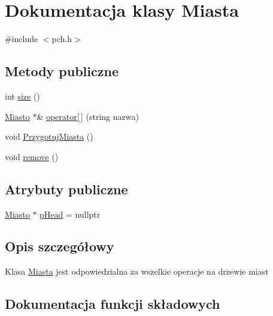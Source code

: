 \hypertarget{class_miasta}{}\section{Dokumentacja klasy Miasta}
\label{class_miasta}


{\ttfamily \#include $<$pch.\+h$>$}

\subsection*{Metody publiczne}
\begin{DoxyCompactItemize}
\item 
int \mbox{\hyperlink{class_miasta_a1f77750958b72a576e37039157741b88}{size}} ()
\item 
\mbox{\hyperlink{struct_miasto}{Miasto}} $\ast$\& \mbox{\hyperlink{class_miasta_ae709896387a043d6d0757e8ee2ebe1eb}{operator\mbox{[}$\,$\mbox{]}}} (string nazwa)
\item 
void \mbox{\hyperlink{class_miasta_a0ed245b8f82ddfde5299e173159cc4d5}{Przygotuj\+Miasta}} ()
\item 
void \mbox{\hyperlink{class_miasta_a62181d2fa245835be892f2beb966e1e6}{remove}} ()
\end{DoxyCompactItemize}
\subsection*{Atrybuty publiczne}
\begin{DoxyCompactItemize}
\item 
\mbox{\hyperlink{struct_miasto}{Miasto}} $\ast$ \mbox{\hyperlink{class_miasta_acd89fd213dfd8fbdc85daee30a22a460}{p\+Head}} = nullptr
\end{DoxyCompactItemize}


\subsection{Opis szczegółowy}
Klasa \mbox{\hyperlink{class_miasta}{Miasta}} jest odpowiedzialna za wszelkie operacje na drzewie miast 

\subsection{Dokumentacja funkcji składowych}
\mbox{\label{class_miasta_ae709896387a043d6d0757e8ee2ebe1eb}} 

